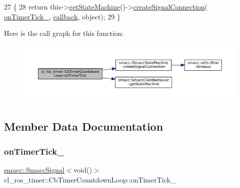 \begin{DoxyCode}
27     \{
28         \textcolor{keywordflow}{return} this->\hyperlink{classsmacc_1_1SmaccClientBehavior_aa817da149f366f6a28794c04eb0744b0}{getStateMachine}()->\hyperlink{classsmacc_1_1ISmaccStateMachine_adf0f42ade0c65cc471960fe2a7c42da2}{createSignalConnection}(
      \hyperlink{classcl__ros__timer_1_1CbTimerCountdownLoop_a9df6547f8ddf45107d8850d8a1a92cf4}{onTimerTick\_}, \hyperlink{servers_2opencv__perception__node_2opencv__perception__node_8cpp_a050e697bd654facce10ea3f6549669b3}{callback}, \textcolor{keywordtype}{object});
29     \}
\end{DoxyCode}
Here is the call graph for this function\+:
\nopagebreak
\begin{figure}[H]
\begin{center}
\leavevmode
\includegraphics[width=350pt]{classcl__ros__timer_1_1CbTimerCountdownLoop_ad251cc8444ca7070f64658bbb77e1275_cgraph}
\end{center}
\end{figure}


\subsection{Member Data Documentation}
\mbox{\label{classcl__ros__timer_1_1CbTimerCountdownLoop_a9df6547f8ddf45107d8850d8a1a92cf4}} 
\subsubsection{\texorpdfstring{on\+Timer\+Tick\+\_\+}{onTimerTick\_}}
{\footnotesize\ttfamily \hyperlink{classsmacc_1_1SmaccSignal}{smacc\+::\+Smacc\+Signal}$<$void()$>$ cl\+\_\+ros\+\_\+timer\+::\+Cb\+Timer\+Countdown\+Loop\+::on\+Timer\+Tick\+\_\+\hspace{0.3cm}{\ttfamily [private]}}



